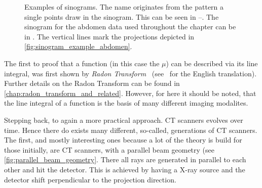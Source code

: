 \begin{figure}
	\centering
	\caption{Examples of sinograms. The name originates from the pattern a single points draw in
		the sinogram. This can be seen in
		--. The
		sinogram for the abdomen data used throughout the chapter
		 can be in
		. The vertical lines mark the projections
		depicted in \autoref{fig:sinogram_example_abdomen}.
	}\label{fig:sinogram_complete}
\end{figure}

The first to proof that a function (in this case the \(\mu\)) can be described via its line
integral, was first shown by \textit{Radon Transform}~\cite{radon_uber_1917}
(see~\cite{radon_determination_1986} for the English translation). Further details on the Radon
Transform can be found in \autoref{chap:radon_transform_and_related}. However, for here it should be
noted, that the line integral of a function is the basis of many different imaging modalites.

Stepping back, to again a more practical approach. CT scanners evolves over time. Hence there do
exists many different, so-called, generations of CT scanners. The first, and mostly interesting ones
because a lot of the theory is build for those initially, are CT scanners, with a parallel beam
geometry (see \autoref{fig:parallel_beam_geometry}. There all rays are generated in parallel to each
other and hit the detector. This is achieved by having a X-ray source and the detector shift
perpendicular to the projection direction.

